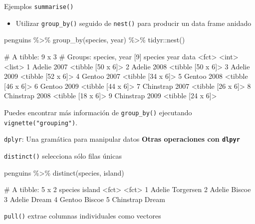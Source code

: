 \documentclass[
  ignorenonframetext,
  aspectratio=169]{beamer}
\newenvironment{Shaded}{\begin{snugshade}}{\end{snugshade}}
\newcommand{\CommentTok}[1]{\textcolor[rgb]{0.56,0.35,0.01}{\textit{#1}}}
\newcommand{\FunctionTok}[1]{\textcolor[rgb]{0.00,0.00,0.00}{#1}}
\newcommand{\NormalTok}[1]{#1}
\newcommand{\SpecialCharTok}[1]{\textcolor[rgb]{0.00,0.00,0.00}{#1}}
\providecommand{\tightlist}{%
  \setlength{\itemsep}{0pt}\setlength{\parskip}{0pt}}
\let\oldverbatim\verbatim
\let\endoldverbatim\endverbatim
\renewenvironment{verbatim}{\tiny\oldverbatim}{\endoldverbatim}
\begin{document}
\begin{frame}[fragile]{Ejemplos \texttt{summarise()}}
\protect\hypertarget{ejemplos-summarise-8}{}
\begin{itemize}
\tightlist
\item
  Utilizar \texttt{group\_by()} seguido de \texttt{nest()} para producir
  un data frame anidado
\end{itemize}

\begin{Shaded}
\begin{Highlighting}[]
\NormalTok{penguins }\SpecialCharTok{\%\textgreater{}\%} 
  \FunctionTok{group\_by}\NormalTok{(species, year) }\SpecialCharTok{\%\textgreater{}\%} 
\NormalTok{  tidyr}\SpecialCharTok{::}\FunctionTok{nest}\NormalTok{()}
\end{Highlighting}
\end{Shaded}

\begin{verbatim}
# A tibble: 9 x 3
# Groups:   species, year [9]
  species    year data             
  <fct>     <int> <list>           
1 Adelie     2007 <tibble [50 x 6]>
2 Adelie     2008 <tibble [50 x 6]>
3 Adelie     2009 <tibble [52 x 6]>
4 Gentoo     2007 <tibble [34 x 6]>
5 Gentoo     2008 <tibble [46 x 6]>
6 Gentoo     2009 <tibble [44 x 6]>
7 Chinstrap  2007 <tibble [26 x 6]>
8 Chinstrap  2008 <tibble [18 x 6]>
9 Chinstrap  2009 <tibble [24 x 6]>
\end{verbatim}

Puedes encontrar más información de \texttt{group\_by()} ejecutando
\texttt{vignette("grouping")}.
\end{frame}

\begin{frame}[fragile]{\texttt{dplyr}: Una gramática para manipular
datos}
\protect\hypertarget{dplyr-una-gramuxe1tica-para-manipular-datos-3}{}
\textbf{Otras operaciones con \texttt{dlpyr}}

\texttt{distinct()} selecciona sólo filas únicas

\begin{Shaded}
\begin{Highlighting}[]
\NormalTok{penguins }\SpecialCharTok{\%\textgreater{}\%} 
  \FunctionTok{distinct}\NormalTok{(species, island)}
\end{Highlighting}
\end{Shaded}

\begin{verbatim}
# A tibble: 5 x 2
  species   island   
  <fct>     <fct>    
1 Adelie    Torgersen
2 Adelie    Biscoe   
3 Adelie    Dream    
4 Gentoo    Biscoe   
5 Chinstrap Dream    
\end{verbatim}

\texttt{pull()} extrae columnas individuales como vectores

\begin{Shaded}
\end{Shaded}
\end{frame}
\end{document}
